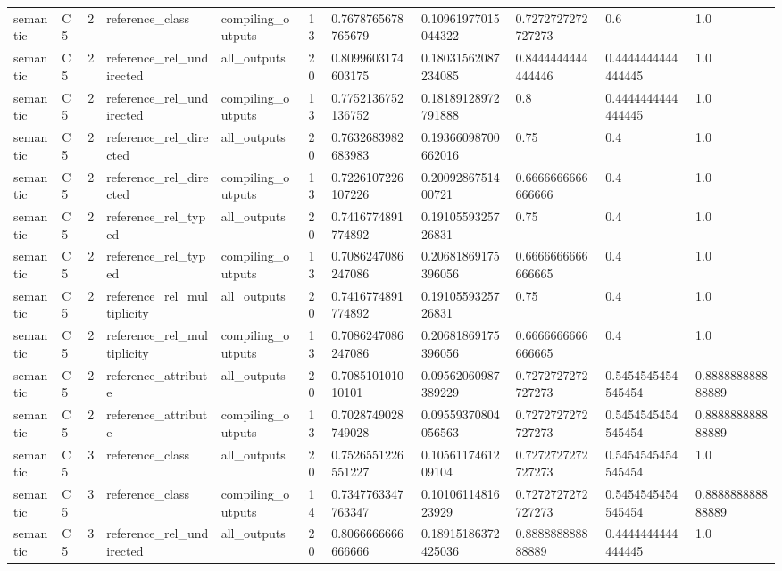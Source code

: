 \begin{tabular}{lllllllllll}
semantic & C5 & 2 & reference\_class & compiling\_outputs & 13 & 0.7678765678765679 & 0.10961977015044322 & 0.7272727272727273 & 0.6 & 1.0 \\
semantic & C5 & 2 & reference\_rel\_undirected & all\_outputs & 20 & 0.8099603174603175 & 0.18031562087234085 & 0.8444444444444446 & 0.4444444444444445 & 1.0 \\
semantic & C5 & 2 & reference\_rel\_undirected & compiling\_outputs & 13 & 0.7752136752136752 & 0.18189128972791888 & 0.8 & 0.4444444444444445 & 1.0 \\
semantic & C5 & 2 & reference\_rel\_directed & all\_outputs & 20 & 0.7632683982683983 & 0.19366098700662016 & 0.75 & 0.4 & 1.0 \\
semantic & C5 & 2 & reference\_rel\_directed & compiling\_outputs & 13 & 0.7226107226107226 & 0.2009286751400721 & 0.6666666666666666 & 0.4 & 1.0 \\
semantic & C5 & 2 & reference\_rel\_typed & all\_outputs & 20 & 0.7416774891774892 & 0.1910559325726831 & 0.75 & 0.4 & 1.0 \\
semantic & C5 & 2 & reference\_rel\_typed & compiling\_outputs & 13 & 0.7086247086247086 & 0.20681869175396056 & 0.6666666666666665 & 0.4 & 1.0 \\
semantic & C5 & 2 & reference\_rel\_multiplicity & all\_outputs & 20 & 0.7416774891774892 & 0.1910559325726831 & 0.75 & 0.4 & 1.0 \\
semantic & C5 & 2 & reference\_rel\_multiplicity & compiling\_outputs & 13 & 0.7086247086247086 & 0.20681869175396056 & 0.6666666666666665 & 0.4 & 1.0 \\
semantic & C5 & 2 & reference\_attribute & all\_outputs & 20 & 0.708510101010101 & 0.09562060987389229 & 0.7272727272727273 & 0.5454545454545454 & 0.888888888888889 \\
semantic & C5 & 2 & reference\_attribute & compiling\_outputs & 13 & 0.7028749028749028 & 0.09559370804056563 & 0.7272727272727273 & 0.5454545454545454 & 0.888888888888889 \\
semantic & C5 & 3 & reference\_class & all\_outputs & 20 & 0.7526551226551227 & 0.1056117461209104 & 0.7272727272727273 & 0.5454545454545454 & 1.0 \\
semantic & C5 & 3 & reference\_class & compiling\_outputs & 14 & 0.7347763347763347 & 0.1010611481623929 & 0.7272727272727273 & 0.5454545454545454 & 0.888888888888889 \\
semantic & C5 & 3 & reference\_rel\_undirected & all\_outputs & 20 & 0.8066666666666666 & 0.18915186372425036 & 0.888888888888889 & 0.4444444444444445 & 1.0 \\

\end{tabular}
